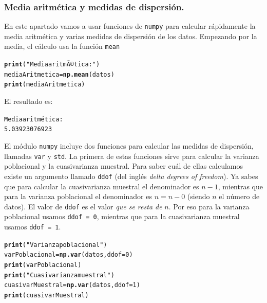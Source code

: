 \documentclass[10pt,a4paper]{article}\usepackage[]{graphicx}\usepackage[]{color}
\makeatletter
\newcommand{\hlnum}[1]{\textcolor[rgb]{0.686,0.059,0.569}{#1}}%
\newcommand{\hlstr}[1]{\textcolor[rgb]{0.192,0.494,0.8}{#1}}%
\newcommand{\hlstd}[1]{\textcolor[rgb]{0.345,0.345,0.345}{#1}}%
\newcommand{\hlkwb}[1]{\textcolor[rgb]{0.69,0.353,0.396}{#1}}%
\newcommand{\hlkwc}[1]{\textcolor[rgb]{0.333,0.667,0.333}{#1}}%
\newcommand{\hlkwd}[1]{\textcolor[rgb]{0.737,0.353,0.396}{\textbf{#1}}}%
\newenvironment{kframe}{%
 \def\at@end@of@kframe{}%
 \ifinner\ifhmode%
  \def\at@end@of@kframe{\end{minipage}}%
  \begin{minipage}{\columnwidth}%
 \fi\fi%
 \def\FrameCommand##1{\hskip\@totalleftmargin \hskip-\fboxsep
 \colorbox{shadecolor}{##1}\hskip-\fboxsep
     \hskip-\linewidth \hskip-\@totalleftmargin \hskip\columnwidth}%
 \MakeFramed {\advance\hsize-\width
   \@totalleftmargin\z@ \linewidth\hsize
   \@setminipage}}%
 {\par\unskip\endMakeFramed%
 \at@end@of@kframe}
\newenvironment{knitrout}{}{} %
\makeatother
\begin{document}
\subsubsection*{Media aritmética y medidas de dispersión.}
\label{tut02:subsubsec:mediaAritmeticaDispersion}



En este apartado vamos a usar funciones de {\tt numpy} para calcular rápidamente la media aritmética y varias medidas de dispersión de los datos. Empezando por la media, el cálculo usa la función {\tt mean}
\begin{knitrout}
\color{fgcolor}\begin{kframe}
\begin{alltt}
\hlkwd{print}\hlstd{(}\hlstr{"Media aritmÃ©tica:"}\hlstd{)}
\hlstd{mediaAritmetica} \hlkwb{=} \hlkwd{np.mean}\hlstd{(datos)}
\hlkwd{print}\hlstd{(mediaAritmetica)}
\end{alltt}
\end{kframe}
\end{knitrout}
El resultado es:
\begin{knitrout}
\color{fgcolor}\begin{kframe}
\begin{alltt}
Media aritmética:
5.03923076923
\end{alltt}
\end{kframe}
\end{knitrout}
El módulo {\tt numpy} incluye dos funciones para calcular las medidas de dispersión, llamadas {\tt var} y {\tt std}. La primera de estas funciones sirve para calcular la varianza poblacional y la cuasivarianza muestral. Para saber cuál de ellas calculamos existe un argumento llamado {\tt ddof} (del inglés {\em delta degrees of freedom}). Ya sabes que para calcular la cuasivarianza muestral el denominador es $n - 1$, mientras que para la varianza poblacional el denominador es $n = n - 0$ (siendo $n$ el número de datos). El valor de {\tt ddof} es el valor {\em que se resta de} $n$. Por eso para la varianza poblacional usamos {\tt ddof = 0}, mientras que para la cuasivarianza muestral usamos {\tt ddof = 1}.
\begin{knitrout}
\color{fgcolor}\begin{kframe}
\begin{alltt}
\hlkwd{print}\hlstd{(}\hlstr{"Varianza poblacional"}\hlstd{)}
\hlstd{varPoblacional} \hlkwb{=} \hlkwd{np.var}\hlstd{(datos,} \hlkwc{ddof}\hlstd{=}\hlnum{0}\hlstd{)}
\hlkwd{print}\hlstd{(varPoblacional)}
\hlkwd{print}\hlstd{(}\hlstr{"Cuasivarianza muestral"}\hlstd{)}
\hlstd{cuasivarMuestral} \hlkwb{=} \hlkwd{np.var}\hlstd{(datos,} \hlkwc{ddof}\hlstd{=}\hlnum{1}\hlstd{)}
\hlkwd{print}\hlstd{(cuasivarMuestral)}
\end{alltt}
\end{kframe}
\end{knitrout}
\end{document}
